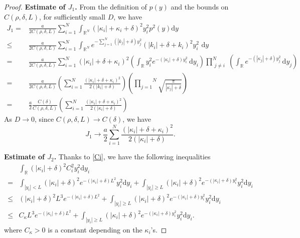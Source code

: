 \documentclass[12pt,reqno]{amsart}
\numberwithin{equation}{section}
\begin{document}
\begin{proof}
\textbf{Estimate of $J_1$.}
From the definition of $p(y)$ and the bounds on $C(\rho,\delta,L)$, for sufficiently small $D$, we have  
\begin{align*}
J_1=&
\frac{a}{2C(\rho,\delta,L)} \sum_{i=1}^N \int_{\mathbb{R}^N} 
(|\kappa_i|+\kappa_i+\delta)^2 y_i^2 p^2(y) \mathrm{d}y\nonumber\\
\leqslant & 
\frac{a}{2C(\rho,\delta,L)} \sum_{i=1}^N \int_{\mathbb{R}^N} 
  e^{- \sum_{j = 1}^N (|k_j | + \delta) y_j^2}  (|k_i | +
  \delta + k_i)^2 y_i^2 \textrm{ d} y \nonumber\\
  ={}&
\frac{a}{2C(\rho,\delta,L)}
\sum_{i=1}^N
(|\kappa_i|+\delta+\kappa_i)^2
\left(
\int_{\mathbb R}
y_i^2e^{-(|\kappa_i|+\delta)y_i^2}\,\mathrm{d}y_i
\right)
\prod_{\substack{ j\neq i}}^N
\left(
\int_{\mathbb R}
e^{-(|\kappa_j|+\delta)y_j^2}\,\mathrm{d}y_j
\right)
\nonumber\\
  = & 
\frac{a}{2C(\rho,\delta,L)} \left( \sum_{i= 1}^N \frac{(|\kappa_i | +
  \delta + \kappa_i)^2}{2 (|k_i | + \delta)} \right) \left( \overset{N}{\underset{j
  = 1}{\prod}} \sqrt{\frac{\pi}{|\kappa_j| + \delta}}  \right) \nonumber\\
  =&
  \frac{a}{2}\frac{C(\delta)}{C(\rho,\delta,L)} \left( \sum_{i = 1}^N \frac{(|\kappa_i | +
  \delta + \kappa_i)^2}{2 (|\kappa_i | + \delta)} \right) 
\end{align*}
As $D\to 0$, since $C(\rho,\delta,L)\to C(\delta)$, we have
\begin{equation}\label{J1}
J_1\to \frac{a}{2}\sum_{i = 1}^N \frac{(|\kappa_i | +
  \delta + \kappa_i)^2}{2 (|\kappa_i| + \delta)}.    
\end{equation}

\textbf{Estimate of $J_2$.} 
Thanks to \eqref{Ci}, we have the following inequalities
\begin{align*}
&\int_{\mathbb{R}}
{(|\kappa_i| + \delta)^2 C_i^2  y_i^2}\mathrm{d}y_i\\
=&\int_{|y_i|<L}
{(|\kappa_i| + \delta)^2   e^{-(|\kappa_i|+\delta)L^2}y_i^2}\mathrm{d}y_i+\int_{|y_i|\ge L}
{(|\kappa_i| + \delta)^2 e^{-(|\kappa_i|+\delta)y_i^2}  y_i^2}\mathrm{d}y_i    \\
\le& (|\kappa_i| + \delta)^2   L^3e^{-(|\kappa_i|+\delta)L^2}+\int_{|y_i|\ge L}
{(|\kappa_i| + \delta)^2 e^{-(|\kappa_i|+\delta)y_i^2}  y_i^2}\mathrm{d}y_i  \\\le& C_{\kappa}   L^3e^{-(|\kappa_i|+\delta)L^2}+\int_{|y_i|\ge L}
{(|\kappa_i| + \delta)^2 e^{-(|\kappa_i|+\delta)y_i^2}  y_i^2}\mathrm{d}y_i. 
\end{align*}
where $C_{\kappa}>0$ is a constant depending on the $\kappa_i$'s.


\end{proof}
\end{document}
